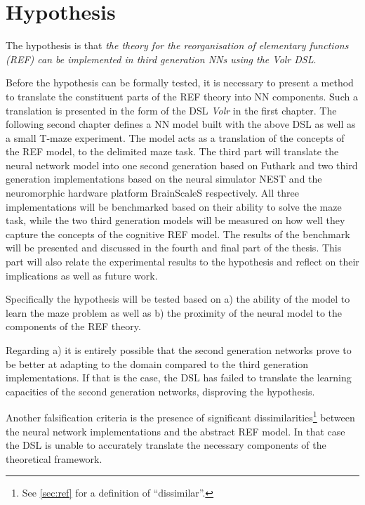 \documentclass[report.tex]{subfiles}
\begin{document}
\section{Hypothesis} \label{ref:hypothesis}
The hypothesis is that 
\textit{the theory for the reorganisation of elementary functions
(\gls{REF}) can be implemented in third generation \gls{NN}s using
the Volr \gls{DSL}}.

Before the hypothesis can be formally tested, it is necessary to
present a method to translate the constituent parts of the \gls{REF} theory
into \gls{NN} components.
Such a translation is presented in the form of the \gls{DSL} \textit{Volr} 
in the first chapter.
The following second chapter defines a \gls{NN}
model built with the above \gls{DSL} as well as a small T-maze experiment. 
The model acts as a translation of the concepts of the \gls{REF} model,
to the delimited maze task.
The third part will translate the neural network model 
into one second generation based on Futhark  and two third
generation implementations based on the neural simulator \gls{NEST} and 
the neuromorphic hardware platform BrainScaleS  respectively.
All three implementations will be benchmarked based on their ability 
to solve the maze task, while the two third generation models will be measured
on how well they capture the concepts of the cognitive 
\gls{REF} model.
The results of the benchmark will be presented and discussed in the 
fourth and final part of the thesis.
This part will also relate the experimental results to the
hypothesis and reflect on their implications as well as future work.

Specifically the hypothesis will be tested based on
a) the ability of the model to learn the maze problem as well as 
b) the proximity of the neural model to the components of the
\gls{REF} theory.

Regarding a) it is entirely possible that the second generation networks prove
to be better at adapting to the domain compared to the third generation
implementations.
If that is the case, the \gls{DSL} has failed to translate
the learning capacities of the second generation networks, disproving the
hypothesis.

Another falsification criteria is the presence of significant
dissimilarities\footnote{See \ref{sec:ref} for a definition of
\enquote{dissimilar}.} between the neural network implementations 
and the abstract \gls{REF} model. 
In that case the \gls{DSL} is unable to accurately translate the
necessary components of the theoretical framework.
\end{document}
